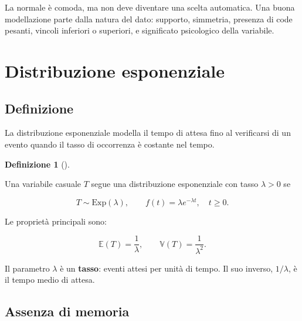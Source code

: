 \documentclass[
  italian,
  letterpaper,
  a4paper,
  11pt,
  open=any]{scrbook}
\theoremstyle{plain}
\theoremstyle{definition}
\theoremstyle{definition}
\newtheorem{definition}{Definizione}[chapter]
\theoremstyle{remark}
\begin{document}
\begin{tcolorbox}[enhanced jigsaw, arc=.35mm, bottomrule=.15mm, bottomtitle=1mm, breakable, colback=white, colbacktitle=quarto-callout-warning-color!10!white, colframe=quarto-callout-warning-color-frame, coltitle=black, left=2mm, leftrule=.75mm, opacityback=0, opacitybacktitle=0.6, rightrule=.15mm, title=\textcolor{quarto-callout-warning-color}{\faExclamationTriangle}\hspace{0.5em}{Non normalizzare tutto}, titlerule=0mm, toprule=.15mm, toptitle=1mm]

La normale è comoda, ma non deve diventare una scelta automatica. Una
buona modellazione parte dalla natura del dato: supporto, simmetria,
presenza di code pesanti, vincoli inferiori o superiori, e significato
psicologico della variabile.

\end{tcolorbox}

\section{Distribuzione esponenziale}\label{sec-cont-exponential}

\subsection{Definizione}\label{definizione-6}

La distribuzione esponenziale modella il tempo di attesa fino al
verificarsi di un evento quando il tasso di occorrenza è costante nel
tempo.

\begin{definition}[]\protect\hypertarget{def-exponential}{}\label{def-exponential}

Una variabile casuale \(T\) segue una distribuzione esponenziale con
tasso \(\lambda > 0\) se

\[
T \sim \mathrm{Exp}(\lambda),
\qquad
f(t) = \lambda e^{-\lambda t}, \quad t \geq 0.
\]

Le proprietà principali sono:

\[
\mathbb{E}(T)=\frac{1}{\lambda},
\qquad
\mathbb{V}(T)=\frac{1}{\lambda^2}.
\]

\end{definition}

Il parametro \(\lambda\) è un \textbf{tasso}: eventi attesi per unità di
tempo. Il suo inverso, \(1/\lambda\), è il tempo medio di attesa.

\subsection{Assenza di memoria}\label{assenza-di-memoria}
\end{document}
